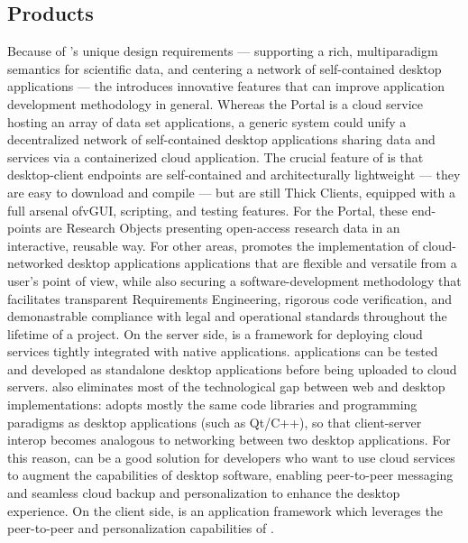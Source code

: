 \documentclass[11pt,letterpaper]{article}
\begin{document}
\subsection{{\lMOSAIC} Products}
Because of {\MOSAIC}'s unique design 
requirements --- supporting a 
rich, multiparadigm semantics for scientific data,  
and centering a network of self-contained 
desktop applications --- the {\MOSAIC} {\SDK} 
introduces innovative features that can improve 
application development methodology in general.  
Whereas the {\MOSAIC} Portal is a cloud service 
hosting an array of data set applications, a 
generic {\MOSAIC} system could unify a decentralized 
network of self-contained desktop applications sharing 
data and services via a containerized cloud application.  
\p{}
The crucial feature of {\MOSAIC} is that desktop-client 
endpoints are self-contained and architecturally 
lightweight --- they are easy to download and 
compile --- but are still Thick Clients, equipped with 
a full arsenal ofvGUI, scripting, and testing features.  
For the {\MOSAIC} Portal, these end-points are Research Objects 
presenting open-access research data in an interactive, reusable 
way.  For other areas, {\MOSAIC} promotes the 
implementation of cloud-networked desktop 
applications applications 
that are flexible and versatile 
from a user's point of view, 
while also securing a software-development methodology 
that facilitates transparent Requirements 
Engineering, rigorous code verification, 
and demonastrable compliance with 
legal and operational standards throughout the 
lifetime of a project.
\p{}
On the 
server side, {\NDPCloud} is a framework for deploying 
cloud services tightly integrated with native applications.  
{\NDPCloud} applications can be tested and 
developed as standalone desktop applications before 
being uploaded to cloud servers.  
{\NDPCloud} also eliminates most of the technological 
gap between web and desktop implementations:   
{\NDPCloud} adopts mostly the same code libraries 
and programming paradigms as 
desktop applications (such as Qt/C++), 
so that client-server interop 
becomes analogous to networking between two 
desktop applications.  For this reason, {\NDPCloud} 
can be a good solution for developers who want to 
use cloud services to augment the capabilities 
of desktop software, enabling peer-to-peer 
messaging and seamless cloud backup and 
personalization to enhance the desktop experience.
\p{}
On the client side, {\VersatileUX} is an {\GUI} 
application framework which leverages 
the peer-to-peer and personalization 
capabilities of {\NDPCloud}.  {\VersatileUX} 
\end{document}
